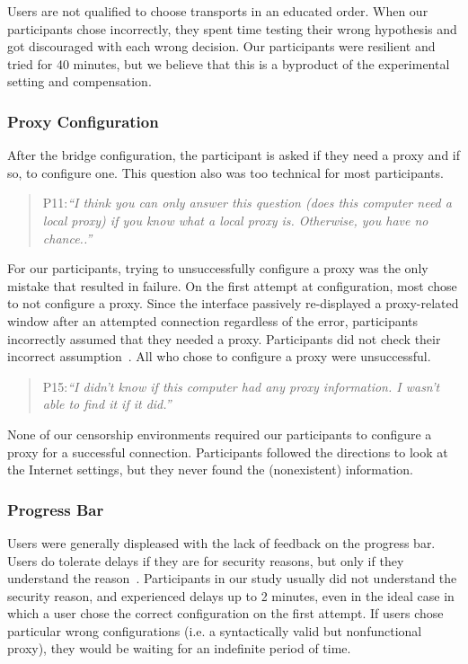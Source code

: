 \documentclass[USenglish,oneside,twocolumn]{article}
\begin{document}
Users are not qualified to choose transports in an educated order. When our participants chose incorrectly, they spent time testing their wrong hypothesis and got discouraged with each wrong decision. Our participants were resilient and tried for 40 minutes, but we believe that this is a byproduct of the experimental setting and compensation.

\subsubsection{Proxy Configuration} 
After the bridge configuration, the participant is asked if they need a proxy and if so, to configure one. This question also was too technical for most participants.

\begin{quotation}
\noindent P11:\textit{``I think you can only answer this question (does this computer need a local proxy) if you know what a local proxy is. Otherwise, you have no chance..''}
\end{quotation}

For our participants, trying to unsuccessfully configure a proxy was the only mistake that resulted in failure. On the first attempt at configuration, most chose to not configure a proxy. Since the interface passively re-displayed a proxy-related window after an attempted connection regardless of the error, participants incorrectly assumed that they needed a proxy. Participants did not check their incorrect assumption~\cite{wason1960failure}. All who chose to configure a proxy were unsuccessful. 

\begin{quotation}
\noindent P15:\textit{``I didn't know if this computer had any proxy information. I wasn't able to find it if it did.''}
\end{quotation}

None of our censorship environments required our participants to configure a proxy for a successful connection. Participants followed the directions to look at the Internet settings, but they never found the (nonexistent) information.

\subsubsection{Progress Bar} 
Users were generally displeased with the lack of feedback on the progress bar. Users do tolerate delays if they are for security reasons, but only if they understand the reason~\cite{egelmanplease}. Participants in our study usually did not understand the security reason, and experienced delays up to 2 minutes, even in the ideal case in which a user chose the correct configuration on the first attempt. If users chose particular wrong configurations (i.e. a syntactically valid but nonfunctional proxy), they would be waiting for an indefinite period of time. 
\end{document}
